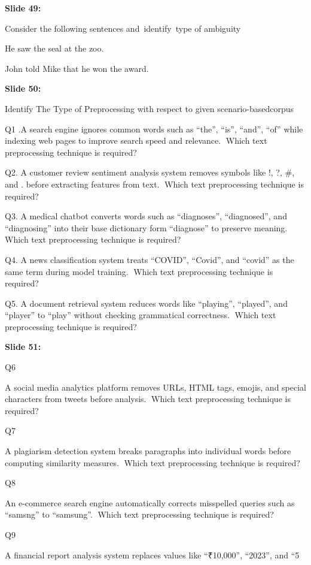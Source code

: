 \documentclass[11pt,a4paper]{article}
\begin{document}
\textbf{Slide 49:}

Consider the following sentences and identify type of ambiguity

He saw the seal at the zoo.

John told Mike that he won the award.

\textbf{Slide 50:}

Identify The Type of Preprocessing with respect to given scenario-basedcorpus

Q1 .A search engine ignores common words such as “the”, “is”, “and”, “of” while indexing web pages to improve search speed and relevance. Which text preprocessing technique is required?

Q2. A customer review sentiment analysis system removes symbols like !, ?, \#, and . before extracting features from text. Which text preprocessing technique is required?

Q3. A medical chatbot converts words such as “diagnoses”, “diagnosed”, and “diagnosing” into their base dictionary form “diagnose” to preserve meaning. Which text preprocessing technique is required?

Q4. A news classification system treats “COVID”, “Covid”, and “covid” as the same term during model training. Which text preprocessing technique is required?

Q5. A document retrieval system reduces words like “playing”, “played”, and “player” to “play” without checking grammatical correctness. Which text preprocessing technique is required?

\textbf{Slide 51:}

Q6

A social media analytics platform removes URLs, HTML tags, emojis, and special characters from tweets before analysis. Which text preprocessing technique is required?

Q7

A plagiarism detection system breaks paragraphs into individual words before computing similarity measures. Which text preprocessing technique is required?

Q8

An e-commerce search engine automatically corrects misspelled queries such as “samsng” to “samsung”. Which text preprocessing technique is required?

Q9

A financial report analysis system replaces values like “₹10,000”, “2023”, and “5%
\end{document}
